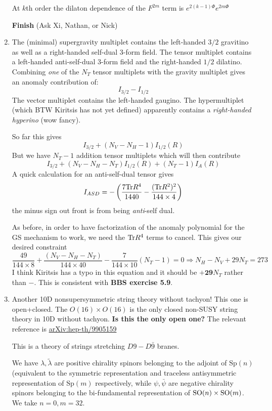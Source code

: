 \documentclass[11pt, class=article, crop=false]{standalone}
\begin{document}
\begin{enumerate}
	At $k$th order the dilaton dependence of the $F^{2m}$ term is $e^{2(k-1) \Phi} e^{2 m \Phi}$
	
	\textbf{Finish} (Ask Xi, Nathan, or Nick)
	
	\item The (minimal) supergravity multiplet contains  the left-handed $3/2$ gravitino as well as a right-handed self-dual 3-form field. The tensor multiplet contains a left-handed anti-self-dual 3-form field and the right-handed $1/2$ dilatino. Combining \emph{one} of the $N_T$ tensor multiplets with the gravity multiplet gives an anomaly contribution of:
	\[
		I_{3/2} - I_{1/2}
	\]
	The vector multiplet contains the left-handed gaugino. The hypermultiplet (which BTW Kiritsis has not yet defined) apparently contains a \emph{right-handed} \emph{hyperino} (wow fancy). 
	
	So far this gives
	\[
		I_{3/2} + (N_V - N_H - 1) I_{1/2} (R)
	\]
	But we have $N_T - 1$ addition tensor multiplets which will then contribute
	\[
		I_{3/2} + (N_V - N_H - N_T) I_{1/2} (R) + (N_T - 1) I_A(R) 
	\]
	A quick calculation for an anti-self-dual tensor gives
	\[
		I_{ASD} = - \left( \frac{7 \mathrm{Tr} R^4}{1440} - \frac{(\mathrm{Tr} R^2)^2}{144 \times 4} \right)
	\]
	the minus sign out front is from being \emph{anti}-self dual. 
	
	As before, in order to have factorization of the anomaly polynomial for the GS mechanism to work, we need the $\mathrm{Tr} R^4$ terms to cancel. This gives our desired constraint
	\[
		\frac{49}{144 \times 8} + \frac{(N_V - N_H - N_T)}{144 \times 40} - \frac{7}{144 \times 10} (N_T- 1) = 0 \Rightarrow N_H - N_V + 29 N_T = 273
	\]
	I think Kiritsis has a typo in this equation and it should be $\mathbf{+29} N_T$ rather than $-$. This is consistent with \textbf{BBS exercise 5.9}.
	
	\item Another 10D nonsupersymmetric string theory without tachyon! This one is open+closed. The $O(16) \times O(16)$ is the only closed non-SUSY string theory in 10D without tachyon. \textbf{Is this the only open one?} The relevant reference is \href{https://arxiv.org/abs/hep-th/9905159}{arXiv:hep-th/9905159}
	
	This is a theory of strings stretching $D9-D\bar 9$ branes.
	
	We have $\lambda, \tilde \lambda$ are positive chirality spinors belonging to the adjoint of $\mathrm{Sp}(n)$ (equivalent to the symmetric representation {\tiny {}} and traceless antisymmetric representation {\tiny {}} of $\mathrm{Sp}(m)$ respectively, while $\psi, \bar \psi$ are negative chirality spinors belonging to the bi-fundamental representation of $\mathrm{SO}(n) \times \mathrm{SO}(m)$. We take $n=0, m = 32$.
	

\end{enumerate}
\end{document}
